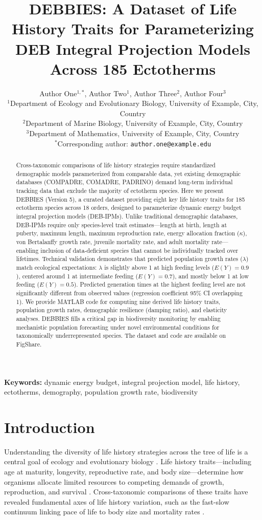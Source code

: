 \documentclass[11pt]{article}
\title{DEBBIES: A Dataset of Life History Traits for Parameterizing DEB Integral Projection Models Across 185 Ectotherms}
\author{
Author One$^{1,*}$, Author Two$^{1}$, Author Three$^{2}$, Author Four$^{3}$ \\[6pt]
\small $^{1}$Department of Ecology and Evolutionary Biology, University of Example, City, Country \\
\small $^{2}$Department of Marine Biology, University of Example, City, Country \\
\small $^{3}$Department of Mathematics, University of Example, City, Country \\
\small $^{*}$Corresponding author: \texttt{author.one@example.edu}
}
\date{}
\begin{document}
\maketitle

\begin{abstract}
Cross-taxonomic comparisons of life history strategies require standardized demographic models parameterized from comparable data, yet existing demographic databases (COMPADRE, COMADRE, PADRINO) demand long-term individual tracking data that exclude the majority of ectotherm species. Here we present DEBBIES (Version 5), a curated dataset providing eight key life history traits for 185 ectotherm species across 18 orders, designed to parameterize dynamic energy budget integral projection models (DEB-IPMs). Unlike traditional demographic databases, DEB-IPMs require only species-level trait estimates---length at birth, length at puberty, maximum length, maximum reproduction rate, energy allocation fraction ($\kappa$), von Bertalanffy growth rate, juvenile mortality rate, and adult mortality rate---enabling inclusion of data-deficient species that cannot be individually tracked over lifetimes. Technical validation demonstrates that predicted population growth rates ($\lambda$) match ecological expectations: $\lambda$ is slightly above 1 at high feeding levels ($E(Y) = 0.9$), centered around 1 at intermediate feeding ($E(Y) = 0.7$), and mostly below 1 at low feeding ($E(Y) = 0.5$). Predicted generation times at the highest feeding level are not significantly different from observed values (regression coefficient 95\% CI overlapping 1). We provide MATLAB code for computing nine derived life history traits, population growth rates, demographic resilience (damping ratio), and elasticity analyses. DEBBIES fills a critical gap in biodiversity monitoring by enabling mechanistic population forecasting under novel environmental conditions for taxonomically underrepresented species. The dataset and code are available on FigShare.
\end{abstract}

\noindent\textbf{Keywords:} dynamic energy budget, integral projection model, life history, ectotherms, demography, population growth rate, biodiversity

\section{Introduction}

Understanding the diversity of life history strategies across the tree of life is a central goal of ecology and evolutionary biology \citep{Stearns1992,Roff2002}. Life history traits---including age at maturity, longevity, reproductive rate, and body size---determine how organisms allocate limited resources to competing demands of growth, reproduction, and survival \citep{Charnov1993}. Cross-taxonomic comparisons of these traits have revealed fundamental axes of life history variation, such as the fast-slow continuum linking pace of life to body size and mortality rates \citep{Promislow1990,Jones2008,Salguero-Gomez2016}.
\end{document}
